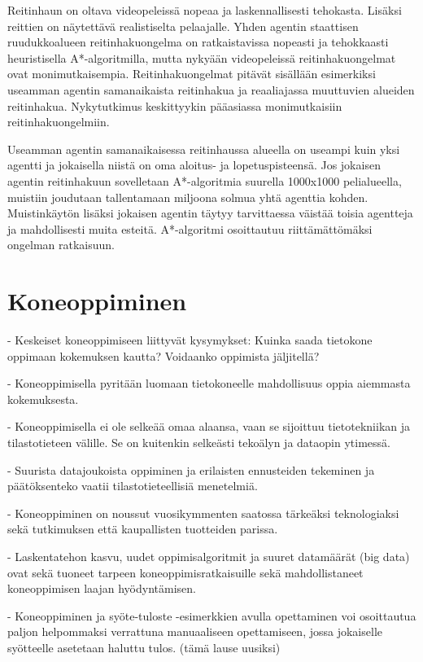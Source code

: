 \documentclass[utf8]{gradu3}
\begin{document}
Reitinhaun on oltava videopeleissä nopeaa ja laskennallisesti tehokasta. Lisäksi reittien on näytettävä realistiselta pelaajalle. Yhden agentin staattisen ruudukkoalueen reitinhakuongelma on ratkaistavissa nopeasti ja tehokkaasti heuristisella A*-algoritmilla, mutta nykyään videopeleissä reitinhakuongelmat ovat monimutkaisempia. Reitinhakuongelmat pitävät sisällään esimerkiksi useamman agentin samanaikaista reitinhakua ja reaaliajassa muuttuvien alueiden reitinhakua. Nykytutkimus keskittyykin pääasiassa monimutkaisiin reitinhakuongelmiin.

Useamman agentin samanaikaisessa reitinhaussa alueella on useampi kuin yksi agentti ja jokaisella niistä on oma aloitus- ja lopetuspisteensä. Jos jokaisen agentin reitinhakuun sovelletaan A*-algoritmia suurella 1000x1000 pelialueella, muistiin joudutaan tallentamaan miljoona solmua yhtä agenttia kohden. Muistinkäytön lisäksi jokaisen agentin täytyy tarvittaessa väistää toisia agentteja ja mahdollisesti muita esteitä. A*-algoritmi osoittautuu riittämättömäksi ongelman ratkaisuun.

\chapter{Koneoppiminen}

- Keskeiset koneoppimiseen liittyvät kysymykset: Kuinka saada tietokone oppimaan kokemuksen kautta? Voidaanko oppimista jäljitellä?

- Koneoppimisella pyritään luomaan tietokoneelle mahdollisuus oppia aiemmasta kokemuksesta.

- Koneoppimisella ei ole selkeää omaa alaansa, vaan se sijoittuu tietotekniikan ja tilastotieteen välille. Se on kuitenkin selkeästi tekoälyn ja dataopin ytimessä.

- Suurista datajoukoista oppiminen ja erilaisten ennusteiden tekeminen ja päätöksenteko vaatii tilastotieteellisiä menetelmiä.

- Koneoppiminen on noussut vuosikymmenten saatossa tärkeäksi teknologiaksi sekä tutkimuksen että kaupallisten tuotteiden parissa.

- Laskentatehon kasvu, uudet oppimisalgoritmit ja suuret datamäärät (big data) ovat sekä tuoneet tarpeen koneoppimisratkaisuille sekä mahdollistaneet koneoppimisen laajan hyödyntämisen.

- Koneoppiminen ja syöte-tuloste -esimerkkien avulla opettaminen voi osoittautua paljon helpommaksi verrattuna manuaaliseen opettamiseen, jossa jokaiselle syötteelle asetetaan haluttu tulos. (tämä lause uusiksi)
\end{document}
